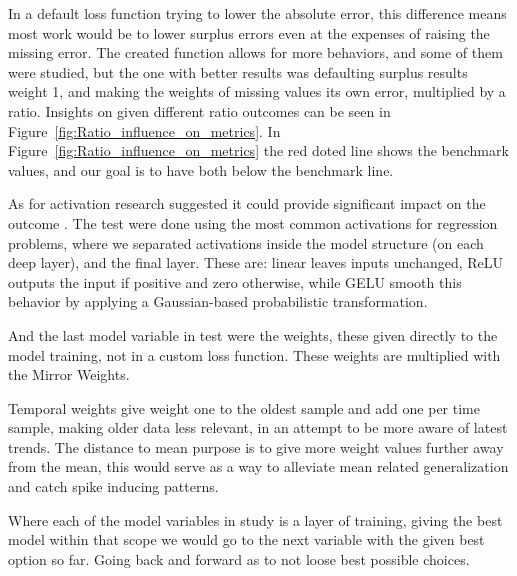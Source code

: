 In a default loss function trying to lower the absolute error, this difference means most work would be to lower surplus errors even at the expenses of raising the missing error. The created function allows for more behaviors, and some of them were studied, but the one with better results was defaulting surplus results weight 1, and making the weights of missing values its own error, multiplied by a ratio. Insights on given different ratio outcomes can be seen in Figure~\ref{fig:Ratio_influence_on_metrics}.
In Figure~\ref{fig:Ratio_influence_on_metrics} the red doted line shows the benchmark values, and our goal is to have both below the benchmark line.\par
As for activation research suggested it could  provide significant impact on the outcome \cite{Vaswani2017,Liu2022}. The test were done using the most common activations for regression problems, where we separated activations inside the model structure (on each deep layer), and the final layer. These are: linear leaves inputs unchanged, \gls{ReLU} outputs the input if positive and zero otherwise, while \gls{GELU} smooth this behavior by applying a Gaussian-based probabilistic transformation. \par
And the last model variable in test were the weights, these given directly to the model training, not in a custom loss function. These weights are multiplied with the Mirror Weights.\par
Temporal weights give weight one to the oldest sample and add one per time sample, making older data less relevant, in an attempt to be more aware of latest trends. The distance to mean purpose is to give more weight values further away from the mean, this would serve as a way to alleviate mean related generalization and catch spike inducing patterns.\par
Where each of the model variables in study is a layer of training, giving the best model within that scope we would go to the next variable with the given best option so far. Going back and forward as to not loose best possible choices.\par


